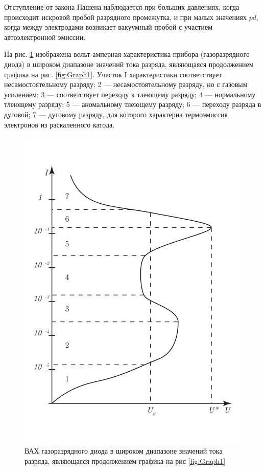\documentclass[a4paper, 12pt]{article}
\begin{document}
	Отступление от закона Пашена наблюдается при больших давлениях, когда происходит искровой пробой разрядного промежутка, и при малых значениях $pd$, когда между электродами возникает вакуумный пробой с участием автоэлектронной эмиссии.\par
	На рис. \ref{fig:Graph5} изображена вольт-амперная характеристика прибора (газоразрядного диода) в широком диапазоне значений тока разряда, являющаяся продолжением графика на рис. \ref{fig:Graph1}. Участок I характеристики соответствует несамостоятельному разряду; 2 — несамостоятельному разряду, но с газовым усилением; 3 — соответствует переходу к тлеющему разряду; 4 — нормальному тлеющему разряду; 5 — аномальному тлеющему разряду; 6 — переходу разряда в дуговой; 7 — дуговому разряду, для которого характерна термоэмиссия электронов из раскаленного катода.\par
\begin{figure}[h]
	\centering
	\includegraphics[scale=0.4]{Graph5.pdf}
	\caption{ВАХ газоразрядного диода в широком диапазоне значений тока разряда, являющаяся продолжением графика на рис \ref{fig:Graph1}}
	\label{fig:Graph5}
\end{figure}
\end{document}
